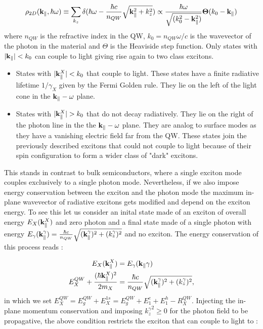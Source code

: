 \begin{equation}
    \rho_{2D}(\mathbf{k}_\parallel, \hbar \omega) \equiv \sum_{k_z}\delta(\hbar\omega - \dfrac{\hbar c}{n_{QW}} \sqrt{\mathbf{k}_\parallel^2+ k_z^2})\propto \dfrac{\hbar\omega}{\sqrt{(k_0^2-\mathbf{k}_\parallel^2)}}\mathbf{\Theta}(k_0-\mathbf{k}_\parallel)
    \label{eq:2D_dos}
\end{equation}
where $n_{QW}$ is the refractive index in the QW, $k_0 = n_{QW}\omega/c$ is the wavevector of the photon in the material and $\Theta$ is the Heaviside step function. 
Only states with $|\mathbf{k}_\parallel|<k_0$ can couple to light giving rise again to two class excitons.
\begin{itemize}
    \item States with $|\mathbf{k}_\parallel^X|<k_0$ that couple to light. These states have a finite radiative lifetime $1/\gamma_X$ given by the Fermi Golden rule. They lie on the left of the
    light cone in the $\mathbf{k}_\parallel-\omega$ plane.
    \item States with $|\kpar^X|>k_0$ that do not decay radiatively. They lie on the right of the photon line in the the $\mathbf{k}_\parallel-\omega$ plane.  They are analog to surface
    modes as they have a vanishing electric field far from the QW. These states join the previously described excitons that could not couple to light because of their spin configuration to form
    a wider class of "dark" excitons.
\end{itemize}
This stands in contrast to bulk semiconductors, where a single exciton mode couples exclusively to a single photon mode.
Nevertheless, if we also impose energy conservation between the exciton and the photon mode the maximum in-plane wavevector of radiative excitons gets modified and depend on the exciton energy.
To see this let us consider an inital state made of an exciton of overall energy $E_X(\mathbf{k}_\parallel^X)$ and zero photon and a final state made of a single photon with energy $E_\gamma(\mathbf{k}_\parallel^{\gamma})= \frac{\hbar c}{n_{QW}} \sqrt{(\mathbf{k}_\parallel^\gamma)^2+ (k_z^\gamma)^2}$ and no exciton.
The energy conservation of this process reads :

\begin{subequations}
    \begin{align}
    E_X(\mathbf{k}_\parallel^X)&= E_\gamma(\mathbf{k}_\parallel{\gamma}) \\
    E_X^{QW} + \dfrac{(\hbar\mathbf{k}_\parallel^X)^2}{2m_X}  &= \dfrac{\hbar c}{n_{QW}} \sqrt{(\mathbf{k}_\parallel^\gamma)^2+ (k_z^\gamma)^2},
    \end{align}
    \label{eq:energy_conservation}
\end{subequations}
in which we set $E_X^{QW} = E_g^{QW}+ E_X^{1s}= E_g^{QW} + E_1^{e} + E_1^{h}-R_X^{QW}$. Injecting the in-plane momentum 
conservation and imposing ${k_z^\gamma}^2 \geq 0$ for the photon field to be propagative, the above condition restricts the exciton that can couple to light to :

